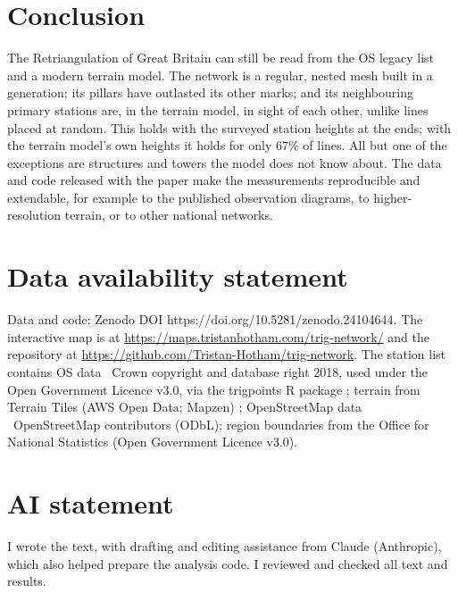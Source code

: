 \documentclass[11pt,a4paper]{article}
\begin{document}
\section{Conclusion}\label{sec:conc}
The Retriangulation of Great Britain can still be read from the OS legacy list and a modern terrain model. The network is a regular, nested mesh built in a generation; its pillars have outlasted its other marks; and its neighbouring primary stations are, in the terrain model, in sight of each other, unlike lines placed at random. This holds with the surveyed station heights at the ends; with the terrain model's own heights it holds for only 67\% of lines. All but one of the exceptions are structures and towers the model does not know about. The data and code released with the paper make the measurements reproducible and extendable, for example to the published observation diagrams, to higher-resolution terrain, or to other national networks.

\section*{Data availability statement}
Data and code: Zenodo DOI https://doi.org/10.5281/zenodo.24104644. The interactive map is at \url{https://maps.tristanhotham.com/trig-network/} and the repository at \url{https://github.com/Tristan-Hotham/trig-network}. The station list contains OS data \textcopyright\ Crown copyright and database right 2018, used under the Open Government Licence v3.0, via the trigpoints R package \citep{jones2018}; terrain from Terrain Tiles (AWS Open Data; Mapzen) \citep{tilezen}; OpenStreetMap data \textcopyright\ OpenStreetMap contributors (ODbL); region boundaries from the Office for National Statistics (Open Government Licence v3.0).

\section*{AI statement}
I wrote the text, with drafting and editing assistance from Claude (Anthropic), which also helped prepare the analysis code. I reviewed and checked all text and results.
\end{document}
